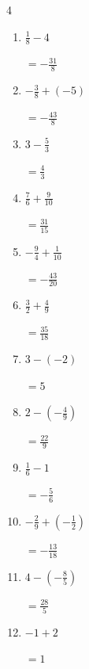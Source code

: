 \begin{multicols}{4}
\begin{enumerate}
\columnbreak %

  \item $\displaystyle \frac{1}{8} - 4$

        $\displaystyle =-\frac{31}{8}$

  \item $\displaystyle -\frac{3}{8} + \left(-5\right)$

        $\displaystyle =-\frac{43}{8}$

  \item $\displaystyle 3 - \frac{5}{3}$

        $\displaystyle =\frac{4}{3}$

  \item $\displaystyle \frac{7}{6} + \frac{9}{10}$

        $\displaystyle =\frac{31}{15}$

  \item $\displaystyle -\frac{9}{4} + \frac{1}{10}$

        $\displaystyle =-\frac{43}{20}$

  \item $\displaystyle \frac{3}{2} + \frac{4}{9}$

        $\displaystyle =\frac{35}{18}$

  \item $\displaystyle 3 - \left(-2\right)$

        $\displaystyle =5$

  \item $\displaystyle 2 - \left(-\frac{4}{9}\right)$

        $\displaystyle =\frac{22}{9}$

  \item $\displaystyle \frac{1}{6} - 1$

        $\displaystyle =-\frac{5}{6}$

  \item $\displaystyle -\frac{2}{9} + \left(-\frac{1}{2}\right)$

        $\displaystyle =-\frac{13}{18}$

\columnbreak %

\resetques

  \item $\displaystyle 4 - \left(-\frac{8}{5}\right)$

        $\displaystyle =\frac{28}{5}$

  \item $\displaystyle -1 + 2$

        $\displaystyle =1$


\end{enumerate}
\end{multicols}
